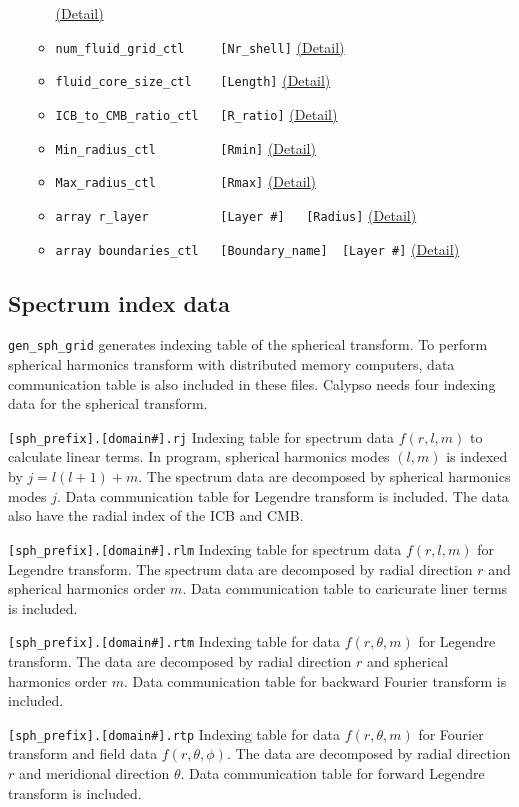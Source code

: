 \begin{itemize}
\begin{itemize}
		\hyperref[href_t:radial_grid_type_ctl]{(Detail)}
%
	\item \verb|num_fluid_grid_ctl     [Nr_shell]|
		\hyperref[href_t:num_fluid_grid_ctl]{(Detail)}
	\item \verb|fluid_core_size_ctl    [Length]|
		\hyperref[href_t:fluid_core_size_ctl]{(Detail)}
	\item \verb|ICB_to_CMB_ratio_ctl   [R_ratio]|
		\hyperref[href_t:ICB_to_CMB_ratio_ctl]{(Detail)}
	\item \verb|Min_radius_ctl         [Rmin]|
		\hyperref[href_t:Min_radius_ctl]{(Detail)}    
		\label{href_i:Min_radius_ctl}
	\item \verb|Max_radius_ctl         [Rmax]|
			\hyperref[href_t:Max_radius_ctl]{(Detail)}    
		\label{href_i:Max_radius_ctl}
%
\\
	\item \verb|array r_layer          [Layer #]   [Radius]|
		\hyperref[href_t:r_layer]{(Detail)}    
%
	\item \verb|array boundaries_ctl   [Boundary_name]  [Layer #]|
		\hyperref[href_t:boundaries_ctl]{(Detail)}    
	\end{itemize}
\end{itemize}

\subsection{Spectrum index data}
\verb|gen_sph_grid| generates indexing table of the spherical transform. To perform spherical harmonics transform with distributed memory computers, data communication table is also included in these files. Calypso needs four indexing data for the spherical transform.
%
\begin{description}
\item{\verb|[sph_prefix].[domain#].rj|} Indexing table for spectrum data $f(r,l,m)$ to calculate linear terms. In program,  spherical harmonics modes $(l,m)$ is indexed by $j = l(l+1) + m$. The spectrum data are decomposed by spherical harmonics modes $j$. Data communication table for Legendre transform is included. The data also have the radial index of the ICB and CMB.
\item{\verb|[sph_prefix].[domain#].rlm|} Indexing table for spectrum data $f(r,l,m)$ for Legendre transform. The spectrum data are decomposed by radial direction $r$ and spherical harmonics order $m$. Data communication table to caricurate liner terms is included.
\item{\verb|[sph_prefix].[domain#].rtm|} Indexing table for data $f(r,\theta,m)$ for Legendre transform. The data are decomposed by radial direction $r$ and spherical harmonics order $m$. Data communication table for backward Fourier transform is included.
\item{\verb|[sph_prefix].[domain#].rtp|} Indexing table for data $f(r,\theta,m)$ for Fourier transform and field data $f(r,\theta,\phi)$. The data are decomposed by radial direction $r$ and meridional direction $\theta$. Data communication table for forward Legendre transform is included.
\end{description}
%

